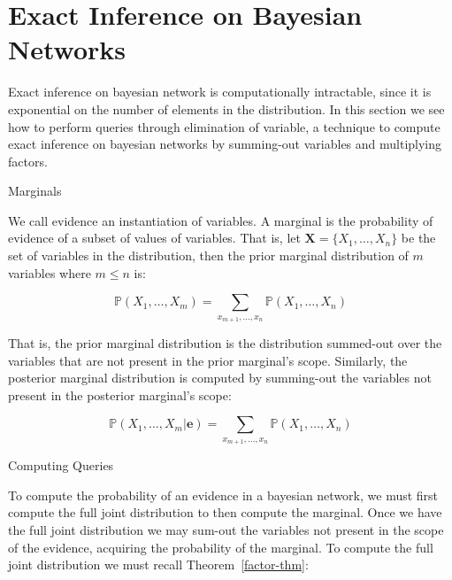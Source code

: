 \documentclass{amsart}
\makeatletter
\def\subsection{\@startsection{subsection}{3}%
  \z@{.5\linespacing\@plus.7\linespacing}{.1\linespacing}%
  {\normalfont\itshape}}
\theoremstyle{plain}
\newcommand{\pr}{\mathbb{P}}
\makeatother
\begin{document}
\section{Exact Inference on Bayesian Networks}

Exact inference on bayesian network is computationally intractable, since it is exponential on the
number of elements in the distribution. In this section we see how to perform queries through
elimination of variable, a technique to compute exact inference on bayesian networks by summing-out
variables and multiplying factors.

\subsection{Marginals}

We call evidence an instantiation of variables. A marginal is the probability of evidence of a
subset of values of variables. That is, let $\mathbf{X}=\{X_1,\ldots,X_n\}$ be the set of variables
in the distribution, then the prior marginal distribution of $m$ variables where $m\leq n$ is:

\begin{equation*}
  \pr(X_1,\ldots,X_m)=\sum_{x_{m+1},\ldots,x_n} \pr(X_1,\ldots,X_n)
\end{equation*}

That is, the prior marginal distribution is the distribution summed-out over the variables that are
not present in the prior marginal's scope. Similarly, the posterior marginal distribution is
computed by summing-out the variables not present in the posterior marginal's scope:

\begin{equation*}
  \pr(X_1,\ldots,X_m|\mathbf{e})=\sum_{x_{m+1},\ldots,x_n} \pr(X_1,\ldots,X_n)
\end{equation*}

\subsection{Computing Queries}

To compute the probability of an evidence in a bayesian network, we must first compute the full
joint distribution to then compute the marginal. Once we have the full joint distribution we may
sum-out the variables not present in the scope of the evidence, acquiring the probability of the
marginal. To compute the full joint distribution we must recall Theorem~\ref{factor-thm}:
\end{document}
